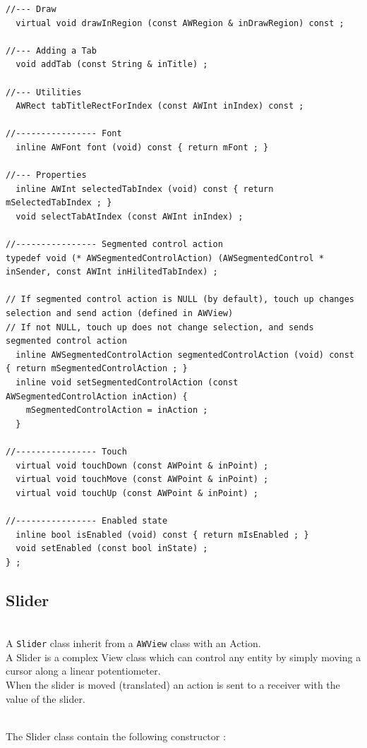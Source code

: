 \documentclass[a4paper,11pt]{extarticle}
\begin{document}
\begin{lstlisting}[language=Arduinonl]
//--- Draw
  virtual void drawInRegion (const AWRegion & inDrawRegion) const ;

//--- Adding a Tab
  void addTab (const String & inTitle) ;

//--- Utilities
  AWRect tabTitleRectForIndex (const AWInt inIndex) const ;

//---------------- Font
  inline AWFont font (void) const { return mFont ; }

//--- Properties
  inline AWInt selectedTabIndex (void) const { return mSelectedTabIndex ; }
  void selectTabAtIndex (const AWInt inIndex) ;

//---------------- Segmented control action
typedef void (* AWSegmentedControlAction) (AWSegmentedControl * inSender, const AWInt inHilitedTabIndex) ;

// If segmented control action is NULL (by default), touch up changes selection and send action (defined in AWView)
// If not NULL, touch up does not change selection, and sends segmented control action
  inline AWSegmentedControlAction segmentedControlAction (void) const { return mSegmentedControlAction ; }
  inline void setSegmentedControlAction (const AWSegmentedControlAction inAction) {
    mSegmentedControlAction = inAction ;
  }

//---------------- Touch
  virtual void touchDown (const AWPoint & inPoint) ;
  virtual void touchMove (const AWPoint & inPoint) ;
  virtual void touchUp (const AWPoint & inPoint) ;

//---------------- Enabled state
  inline bool isEnabled (void) const { return mIsEnabled ; }
  void setEnabled (const bool inState) ;
} ;
\end{lstlisting}


\newpage
\subsection{Slider}

~\\ A \texttt{Slider} class inherit from a \texttt{AWView} class with an Action.
~\\ A Slider is a complex View class which can control any entity by simply moving a cursor along a linear potentiometer.
~\\ When the slider is moved (translated) an action is sent to a receiver with the value of the slider.

~\\ The Slider class contain the following constructor :
\end{document}
